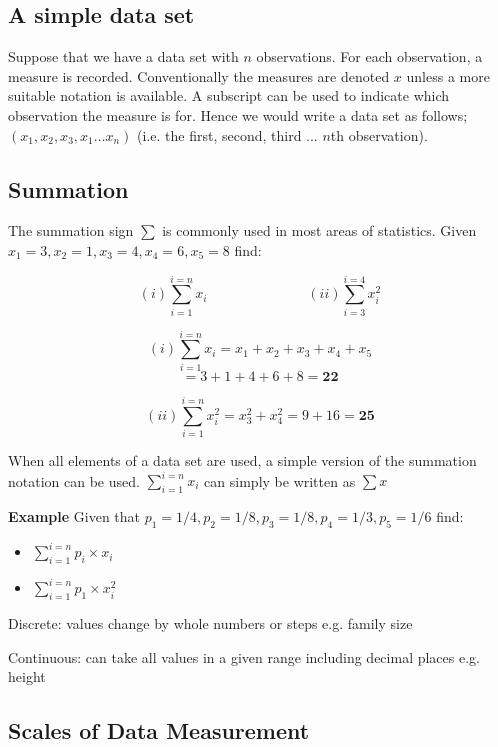 \documentclass[12pt, a4paper]{report}
\theoremstyle{definition}
\theoremstyle{remark}
\begin{document}
\subsection{A simple data set}
Suppose that we have a data set with $n$ observations. For each observation, a measure is recorded. Conventionally the measures are denoted $x$ unless a more suitable notation is available. A subscript can be used to indicate which observation the measure is for.
Hence we would write a data set as follows; $(x_{1}, x_{2},x_{3} , x_{1} \dots x_{n})$ (i.e. the first, second, third ... $n$th observation).


\subsection{Summation}
The summation sign $\sum$ is commonly used in most areas of statistics.
Given $x_1 = 3, x_2= 1, x_3 = 4, x_4 = 6, x_5= 8 $ find:

\[
(i) \displaystyle\sum_{i=1}^{i=n} x_{i}  \hspace{3cm}
(ii) \displaystyle\sum_{i=3}^{i=4} x_{i}^2
\]


\[(i) \displaystyle\sum_{i=1}^{i=n} x_{i} = x_1 + x_2 +  x_3 +  x_4 + x_5 \]  \[= 3 +1 +4 +6 + 8  = \textbf{22} \]

\[ (ii) \displaystyle\sum_{i=1}^{i=n} x_{i}^2 = x_3^2 + x_4^2  = 9 + 16 = \textbf{25} \]

\noindent When all elements of a data set are used, a simple version of the summation notation can be used.
$\displaystyle\sum_{i=1}^{i=n} x_{i}$  can simply be written as $\sum x$



\noindent \textbf{Example}
Given that $p_1= 1/4, p_2= 1/8, p_3= 1/8,p_4= 1/3, p_5 = 1/6$ find:

\begin{itemize}
	\item $\displaystyle\sum_{i=1}^{i=n} p_{i} \times x_{i}$
	\item $\displaystyle\sum_{i=1}^{i=n} p_{1} \times x_{i}^2$
\end{itemize}



Discrete: values change by whole numbers or steps e.g. family size

Continuous: can take all values in a given range including decimal places e.g. height


\subsection{Scales of Data Measurement}
\end{document}

